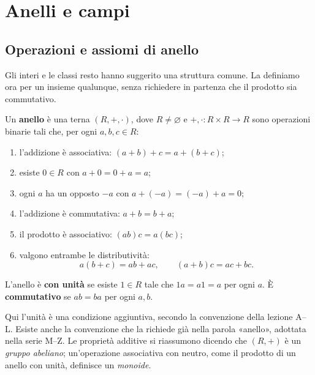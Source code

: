 \chapter{Anelli e campi}\label{cap:anelli}

\section{Operazioni e assiomi di anello}
Gli interi e le classi resto hanno suggerito una struttura comune. La definiamo ora per un insieme qualunque, senza richiedere in partenza che il prodotto sia commutativo.

\begin{definizione}
Un \textbf{anello} è una terna $(R,+,\cdot)$, dove $R\ne\varnothing$ e $+,\cdot:R\times R\to R$ sono operazioni binarie tali che, per ogni $a,b,c\in R$:
\begin{enumerate}
\item l'addizione è associativa: $(a+b)+c=a+(b+c)$;
\item esiste $0\in R$ con $a+0=0+a=a$;
\item ogni $a$ ha un opposto $-a$ con $a+(-a)=(-a)+a=0$;
\item l'addizione è commutativa: $a+b=b+a$;
\item il prodotto è associativo: $(ab)c=a(bc)$;
\item valgono entrambe le distributività:
\[
a(b+c)=ab+ac,\qquad(a+b)c=ac+bc.
\]
\end{enumerate}
L'anello è \textbf{con unità} se esiste $1\in R$ tale che $1a=a1=a$ per ogni $a$. È \textbf{commutativo} se $ab=ba$ per ogni $a,b$.
\end{definizione}

\begin{osservazione}
Qui l'unità è una condizione aggiuntiva, secondo la convenzione della lezione A–L. Esiste anche la convenzione che la richiede già nella parola «anello», adottata nella serie M–Z. Le proprietà additive si riassumono dicendo che $(R,+)$ è un \emph{gruppo abeliano}; un'operazione associativa con neutro, come il prodotto di un anello con unità, definisce un \emph{monoide}.
\end{osservazione}


